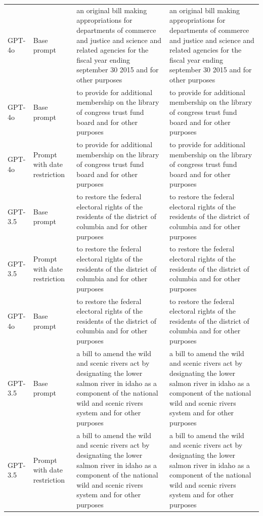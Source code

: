 \begin{longtable}{>{\raggedright\arraybackslash}p{1.4cm}>{\raggedright\arraybackslash}p{1.4cm}>{\raggedright\arraybackslash}p{5.5cm}>{\raggedright\arraybackslash}p{5.5cm}}
GPT-4o & Base prompt & an original bill making appropriations for departments of commerce and justice and science and related agencies for the fiscal year ending september 30 2015 and for other purposes & an original bill making appropriations for departments of commerce and justice and science and related agencies for the fiscal year ending september 30 2015 and for other purposes\\
GPT-4o & Base prompt & to provide for additional membership on the library of congress trust fund board and for other purposes & to provide for additional membership on the library of congress trust fund board and for other purposes\\
GPT-4o & Prompt with date restriction & to provide for additional membership on the library of congress trust fund board and for other purposes & to provide for additional membership on the library of congress trust fund board and for other purposes\\
GPT-3.5 & Base prompt & to restore the federal electoral rights of the residents of the district of columbia and for other purposes & to restore the federal electoral rights of the residents of the district of columbia and for other purposes\\
GPT-3.5 & Prompt with date restriction & to restore the federal electoral rights of the residents of the district of columbia and for other purposes & to restore the federal electoral rights of the residents of the district of columbia and for other purposes\\
GPT-4o & Base prompt & to restore the federal electoral rights of the residents of the district of columbia and for other purposes & to restore the federal electoral rights of the residents of the district of columbia and for other purposes\\
GPT-3.5 & Base prompt & a bill to amend the wild and scenic rivers act by designating the lower salmon river in idaho as a component of the national wild and scenic rivers system and for other purposes & a bill to amend the wild and scenic rivers act by designating the lower salmon river in idaho as a component of the national wild and scenic rivers system and for other purposes\\
GPT-3.5 & Prompt with date restriction & a bill to amend the wild and scenic rivers act by designating the lower salmon river in idaho as a component of the national wild and scenic rivers system and for other purposes & a bill to amend the wild and scenic rivers act by designating the lower salmon river in idaho as a component of the national wild and scenic rivers system and for other purposes\\

\end{longtable}
